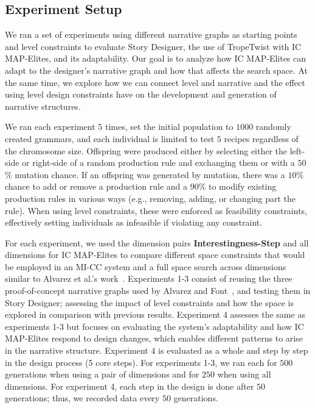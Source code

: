 \subsection{Experiment Setup}







We ran a set of experiments using different narrative graphs as starting points and level constraints to evaluate Story Designer, the use of TropeTwist with IC MAP-Elites, and its adaptability. Our goal is to analyze how IC MAP-Elites can adapt to the designer's narrative graph and how that affects the search space. At the same time, we explore how we can connect level and narrative and the effect using level design constraints have on the development and generation of narrative structures.

We ran each experiment $5$ times, set the initial population to $1000$ randomly created grammars, and each individual is limited to test $5$ recipes regardless of the chromosome size. Offspring were produced either by selecting either the left-side or right-side of a random production rule and exchanging them or with a $50$\% mutation chance. If an offspring was generated by mutation, there was a $10$\% chance to add or remove a production rule and a $90$\% to modify existing production rules in various ways (e.g., removing, adding, or changing part the rule). When using level constraints, these were enforced as feasibility constraints, effectively setting individuals as infeasible if violating any constraint.

For each experiment, we used the dimension pairs \textbf{Interestingness}\textbf{-Step} and all dimensions for IC MAP-Elites to compare different space constraints that would be employed in an MI-CC system and a full space search across dimensions similar to Alvarez et al.'s work~\cite{p11alvarez_interactive_2020}. Experiments 1-3 consist of reusing the three proof-of-concept narrative graphs used by Alvarez and Font~\cite{p11alvarez_tropetwist_2022}, and testing them in Story Designer; assessing the impact of level constraints and how the space is explored in comparison with previous results. Experiment 4 assesses the same as experiments 1-3 but focuses on evaluating the system's adaptability and how IC MAP-Elites respond to design changes, which enables different patterns to arise in the narrative structure. Experiment 4 is evaluated as a whole and step by step in the design process (5 core steps). For experiments 1-3, we ran each for $500$ generations when using a pair of dimensions and for $250$ when using all dimensions. For experiment 4, each step in the design is done after $50$ generations; thus, we recorded data every $50$ generations.


